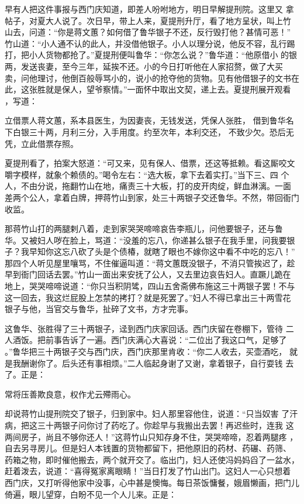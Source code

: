早有人把这件事报与西门庆知道，即差人吩咐地方，明日早解提刑院。这里又
拿帖子，对夏大人说了。次日早，带上人来，夏提刑升厅，看了地方呈状，叫上竹
山去，问道：“你是蒋文蕙？如何借了鲁华银子不还，反行毁打他？甚情可恶！”
竹山道：“小人通不认的此人，并没借他银子。小人以理分说，他反不容，乱行踢
打，把小人货物都抢了。”夏提刑便叫鲁华：“你怎么说？”鲁华道：“他原借小
的银两，发送丧妻，至今三年，延挨不还。小的今日打听他在人家招赘，做了大买
卖，问他理讨，他倒百般辱骂小的，说小的抢夺他的货物。见有他借银子的文书在
此，这张胜就是保人，望爷察情。”一面怀中取出文契，递上去。夏提刑展开观看
，写道：

立借票人蒋文蕙，系本县医生，为因妻丧，无钱发送，凭保人张胜，
借到鲁华名下白银三十两，月利三分，入手用度。约至次年，本利交还，
不致少欠。恐后无凭，立此借票存照。

夏提刑看了，拍案大怒道：“可又来，见有保人、借票，还这等抵赖。看这厮咬文
嚼字模样，就象个赖债的。”喝令左右：“选大板，拿下去着实打。”当下三、四
个人，不由分说，拖翻竹山在地，痛责三十大板，打的皮开肉绽，鲜血淋漓。一面
差两个公人，拿着白牌，押蒋竹山到家，处三十两银子交还鲁华。不然，带回衙门
收监。

那蒋竹山打的两腿剌八着，走到家哭哭啼啼哀告李瓶儿，问他要银子，还与鲁
华。又被妇人哕在脸上，骂道：“没羞的忘八，你递甚么银子在我手里，问我要银
子？我早知你这忘八砍了头是个债椿，就瞎了眼也不嫁你这中看不中吃的忘八！”
那四个人听见屋里嚷骂，不住催逼叫道：“蒋文蕙既没银子，不消只管挨迟了，趁
早到衙门回话去罢。”竹山一面出来安抚了公人，又去里边哀告妇人。直蹶儿跪在
地上，哭哭啼啼说道：“你只当积阴骘，四山五舍斋佛布施这三十两银子罢！不与
这一回去，我这烂屁股上怎禁的拷打？就是死罢了。”妇人不得已拿出三十两雪花
银子与他，当官交与鲁华，扯碎了文书，方才完事。

这鲁华、张胜得了三十两银子，迳到西门庆家回话。西门庆留在卷棚下，管待
二人酒饭。把前事告诉了一遍。西门庆满心大喜说：“二位出了我这口气，足够了
。”鲁华把三十两银子交与西门庆，西门庆那里肯收：“你二人收去，买壶酒吃，
就是我酬谢你了。后头还有事相烦。”二人临起身谢了又谢，拿着银子，自行耍钱
去了。正是：

常将压善欺良意，权作尤云殢雨心。

却说蒋竹山提刑院交了银子，归到家中。妇人那里容他住，说道：“只当奴害
了汗病，把这三十两银子问你讨了药吃了。你趁早与我搬出去罢！再迟些时，连我
这两间房子，尚且不够你还人！”这蒋竹山只知存身不住，哭哭啼啼，忍着两腿疼
，自去另寻房儿。但是妇人本钱置的货物都留下，把他原旧的药材、药碾、药筛、
药箱之物，即时催他搬去，两个就开交了。临出门，妇人还使冯妈妈舀了一盆水，
赶着泼去，说道：“喜得冤家离眼睛！”当日打发了竹山出门。这妇人一心只想着
西门庆，又打听得他家中没事，心中甚是懊悔。每日茶饭慵餐，娥眉懒画，把门儿
倚遍，眼儿望穿，白盼不见一个人儿来。正是：

